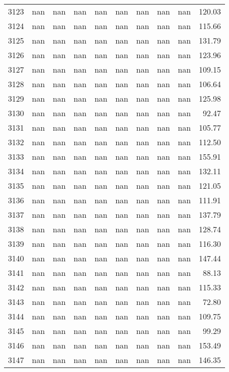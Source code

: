 \begin{tabular}{lrrrrrrrrr}
3123 & nan & nan & nan & nan & nan & nan & nan & nan & 120.03 \\
3124 & nan & nan & nan & nan & nan & nan & nan & nan & 115.66 \\
3125 & nan & nan & nan & nan & nan & nan & nan & nan & 131.79 \\
3126 & nan & nan & nan & nan & nan & nan & nan & nan & 123.96 \\
3127 & nan & nan & nan & nan & nan & nan & nan & nan & 109.15 \\
3128 & nan & nan & nan & nan & nan & nan & nan & nan & 106.64 \\
3129 & nan & nan & nan & nan & nan & nan & nan & nan & 125.98 \\
3130 & nan & nan & nan & nan & nan & nan & nan & nan & 92.47 \\
3131 & nan & nan & nan & nan & nan & nan & nan & nan & 105.77 \\
3132 & nan & nan & nan & nan & nan & nan & nan & nan & 112.50 \\
3133 & nan & nan & nan & nan & nan & nan & nan & nan & 155.91 \\
3134 & nan & nan & nan & nan & nan & nan & nan & nan & 132.11 \\
3135 & nan & nan & nan & nan & nan & nan & nan & nan & 121.05 \\
3136 & nan & nan & nan & nan & nan & nan & nan & nan & 111.91 \\
3137 & nan & nan & nan & nan & nan & nan & nan & nan & 137.79 \\
3138 & nan & nan & nan & nan & nan & nan & nan & nan & 128.74 \\
3139 & nan & nan & nan & nan & nan & nan & nan & nan & 116.30 \\
3140 & nan & nan & nan & nan & nan & nan & nan & nan & 147.44 \\
3141 & nan & nan & nan & nan & nan & nan & nan & nan & 88.13 \\
3142 & nan & nan & nan & nan & nan & nan & nan & nan & 115.33 \\
3143 & nan & nan & nan & nan & nan & nan & nan & nan & 72.80 \\
3144 & nan & nan & nan & nan & nan & nan & nan & nan & 109.75 \\
3145 & nan & nan & nan & nan & nan & nan & nan & nan & 99.29 \\
3146 & nan & nan & nan & nan & nan & nan & nan & nan & 153.49 \\
3147 & nan & nan & nan & nan & nan & nan & nan & nan & 146.35 \\

\end{tabular}
